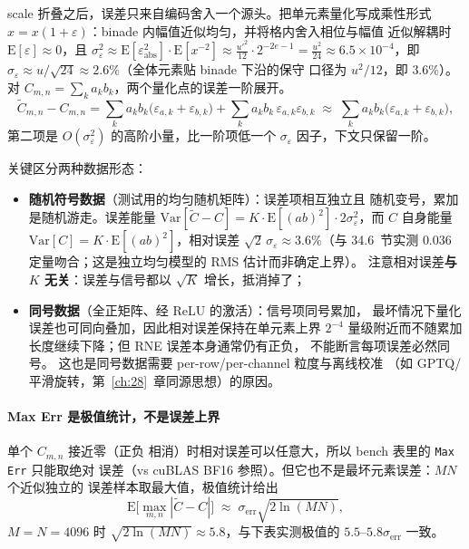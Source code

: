 scale 折叠之后，误差只来自编码舍入一个源头。把单元素量化写成乘性形式
$\hat{x} = x(1+\varepsilon)$：binade 内幅值近似均匀，并将格内舍入相位与幅值
近似解耦时 $\mathrm{E}[\varepsilon] \approx 0$，且
$\sigma_\varepsilon^2 \approx \mathrm{E}[\varepsilon_{\mathrm{abs}}^2]\cdot\mathrm{E}[x^{-2}]
\approx \frac{u'^2}{12}\cdot 2^{-2e-1} = \frac{u^2}{24} \approx 6.5\times 10^{-4}$，即
$\sigma_\varepsilon \approx u/\sqrt{24} \approx 2.6\%$（全体元素贴 binade 下沿的保守
口径为 $u^2/12$，即 $3.6\%$）。
对 $C_{m,n}=\sum_k a_k b_k$，两个量化点的误差一阶展开。
\begin{equation}\label{eq:34-err-expand}
  \tilde{C}_{m,n} - C_{m,n}
  = \sum_{k} a_k b_k\bigl(\varepsilon_{a,k} + \varepsilon_{b,k}\bigr)
  + \sum_k a_k b_k\,\varepsilon_{a,k}\varepsilon_{b,k}
  \;\approx\; \sum_{k} a_k b_k\bigl(\varepsilon_{a,k} + \varepsilon_{b,k}\bigr),
\end{equation}
第二项是 $O(\sigma_\varepsilon^2)$ 的高阶小量，比一阶项低一个
$\sigma_\varepsilon$ 因子，下文只保留一阶。

关键区分两种数据形态：

\begin{itemize}[itemsep=1pt,topsep=2pt]
  \item \textbf{随机符号数据}（测试用的均匀随机矩阵）：误差项相互独立且
        随机变号，累加是随机游走。误差能量
        $\mathrm{Var}[\tilde{C}-C] = K\cdot\mathrm{E}[(ab)^2]\cdot
        2\sigma_\varepsilon^2$，而 $C$ 自身能量
        $\mathrm{Var}[C] = K\cdot\mathrm{E}[(ab)^2]$，相对误差
        $\sqrt{2}\,\sigma_\varepsilon \approx 3.6\%$（与 34.6~节实测
        $0.036$ 定量吻合；这是独立均匀模型的 RMS 估计而非确定上界）。
        注意相对误差\textbf{与 $K$ 无关}：误差与信号都以 $\sqrt{K}$
        增长，抵消掉了；
  \item \textbf{同号数据}（全正矩阵、经 ReLU 的激活）：信号项同号累加，
        最坏情况下量化误差也可同向叠加，因此相对误差保持在单元素上界
        $2^{-4}$ 量级附近而不随累加长度继续下降；但 RNE 误差本身通常仍有正负，
        不能断言每项误差必然同号。
        这也是同号数据需要 per-row/per-channel 粒度与离线校准
        （如 GPTQ/平滑旋转，第~\ref{ch:28}~章同源思想）的原因。
\end{itemize}

\paragraph{Max Err 是极值统计，不是误差上界} 单个 $C_{m,n}$ 接近零（正负
相消）时相对误差可以任意大，所以 bench 表里的 \texttt{Max Err} 只能取绝对
误差（vs cuBLAS BF16 参照）。但它也不是最坏元素误差：$MN$ 个近似独立的
误差样本取最大值，极值统计给出
\begin{equation}\label{eq:34-err-max}
  \mathrm{E}\bigl[\max_{m,n} |\tilde{C}-C|\bigr]
  \;\approx\; \sigma_{\text{err}}\sqrt{2\ln(MN)},
\end{equation}
$M{=}N{=}4096$ 时 $\sqrt{2\ln(MN)} \approx 5.8$，与下表实测极值的
$5.5$--$5.8\sigma_{\text{err}}$ 一致。

